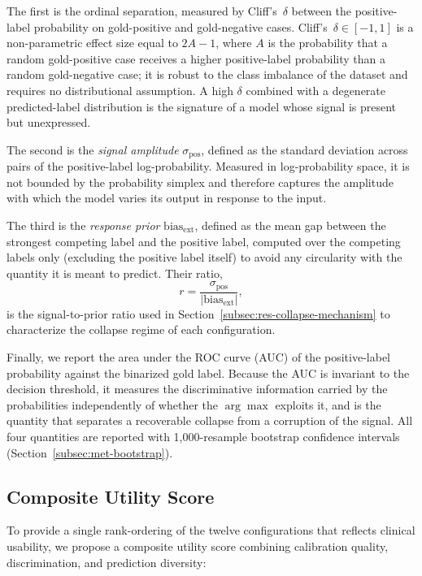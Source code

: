 The first is the ordinal separation, measured by Cliff's~$\delta$ 
between the positive-label probability on gold-positive and 
gold-negative cases. Cliff's~$\delta \in [-1, 1]$ is a non-parametric 
effect size equal to $2A - 1$, where $A$ is the probability that a 
random gold-positive case receives a higher positive-label probability 
than a random gold-negative case; it is robust to the class imbalance of 
the dataset and requires no distributional assumption. A high $\delta$ 
combined with a degenerate predicted-label distribution is the signature 
of a model whose signal is present but unexpressed.

The second is the \emph{signal amplitude} $\sigma_{\text{pos}}$, defined 
as the standard deviation across pairs of the positive-label 
log-probability. Measured in log-probability space, it is not bounded by 
the probability simplex and therefore captures the amplitude with which 
the model varies its output in response to the input.

The third is the \emph{response prior} $\text{bias}_{\text{ext}}$, 
defined as the mean gap between the strongest competing label and the 
positive label, computed over the competing labels only (excluding the 
positive label itself) to avoid any circularity with the quantity it is 
meant to predict. Their ratio,
\begin{equation}
    r = \frac{\sigma_{\text{pos}}}{\left|\text{bias}_{\text{ext}}\right|},
    \label{eq:signal-prior}
\end{equation}
is the signal-to-prior ratio used in 
Section~\ref{subsec:res-collapse-mechanism} to characterize the collapse 
regime of each configuration.

Finally, we report the area under the ROC curve (AUC) of the 
positive-label probability against the binarized gold label. Because the 
AUC is invariant to the decision threshold, it measures the 
discriminative information carried by the probabilities independently of 
whether the $\arg\max$ exploits it, and is the quantity that separates a 
recoverable collapse from a corruption of the signal. All four 
quantities are reported with 1{,}000-resample bootstrap confidence 
intervals (Section~\ref{subsec:met-bootstrap}).

\subsection{Composite Utility Score}
\label{subsec:met-composite}

To provide a single rank-ordering of the twelve configurations that 
reflects clinical usability, we propose a composite utility score 
combining calibration quality, discrimination, and prediction diversity:

